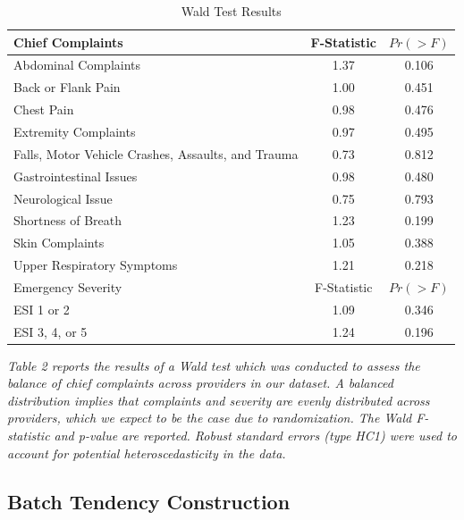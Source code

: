 \documentclass[,,nonblindrev]{informs}
\begin{document}
\begin{table}[htbp]
    \centering
    \caption{Wald Test Results}
    \label{tab:wald_test}
    \begin{tabular}{p{10cm}cc}
        \toprule
        Chief Complaints & F-Statistic & $Pr(> F)$ \\
        \midrule
        Abdominal Complaints & 1.37 & 0.106 \\
        Back or Flank Pain & 1.00 & 0.451 \\
        Chest Pain & 0.98 & 0.476 \\
        Extremity Complaints & 0.97 & 0.495 \\
        Falls, Motor Vehicle Crashes, Assaults, and Trauma & 0.73 & 0.812 \\
        Gastrointestinal Issues & 0.98 & 0.480 \\
        Neurological Issue & 0.75 & 0.793 \\
        Shortness of Breath & 1.23 & 0.199 \\
        Skin Complaints & 1.05 & 0.388 \\
        Upper Respiratory Symptoms & 1.21 & 0.218 \\
        \midrule
        Emergency Severity & F-Statistic & $Pr(> F)$ \\
        \midrule
        ESI 1 or 2 & 1.09 & 0.346 \\
        ESI 3, 4, or 5 & 1.24 & 0.196 \\
        \bottomrule
    \end{tabular}
\begin{tablenotes}
\small
\item \textit{Table 2 reports the results of a Wald test which was conducted to assess the balance of chief complaints across providers in our dataset. A balanced distribution implies that complaints and severity are evenly distributed across providers, which we expect to be the case due to randomization. The Wald F-statistic and p-value are reported. Robust standard errors (type HC1) were used to account for potential heteroscedasticity in the data.}
\end{tablenotes}
\end{table}

\hypertarget{batch-tendency-construction}{%
\subsection{Batch Tendency
Construction}\label{batch-tendency-construction}}
\end{document}
